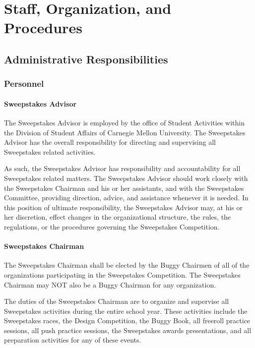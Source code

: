 \chapter{Staff, Organization, and Procedures}

\section{Administrative Responsibilities}

\subsection{Personnel}

\subsubsection{Sweepstakes Advisor}

	The Sweepstakes Advisor is employed by the office of Student Activities within the Division of Student Affairs of Carnegie Mellon University. The Sweepstakes Advisor has the overall responsibility for directing and supervising all Sweepstakes related activities.

	As such, the Sweepstakes Advisor has responsibility and accountability for all Sweepstakes related matters. The Sweepstakes Advisor should work closely with the Sweepstakes Chairman and his or her assistants, and with the Sweepstakes Committee, providing direction, advice, and assistance whenever it is needed. In this position of ultimate responsibility, the Sweepstakes Advisor may, at his or her discretion, effect changes in the organizational structure, the rules, the regulations, or the procedures governing the Sweepstakes Competition.

\subsubsection{Sweepstakes Chairman}

	The Sweepstakes Chairman shall be elected by the Buggy Chairmen of all of the organizations participating in the Sweepstakes Competition. The Sweepstakes Chairman may NOT also be a Buggy Chairman for any organization.

	The duties of the Sweepstakes Chairman are to organize and supervise all Sweepstakes activities during the entire school year. These activities include the Sweepstakes races, the Design Competition, the Buggy Book, all freeroll practice sessions, all push practice sessions, the Sweepstakes awards presentations, and all preparation activities for any of these events.


